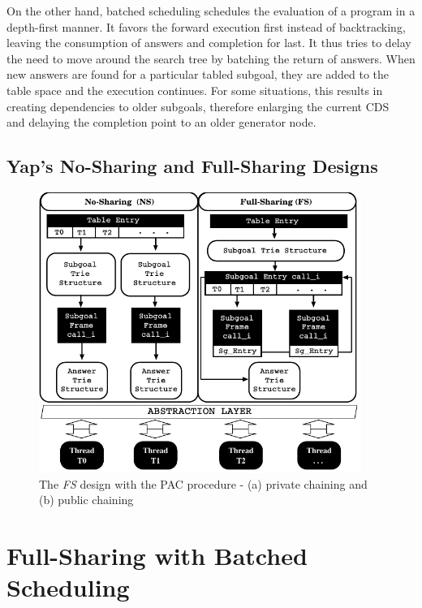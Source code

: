 \documentclass{llncs}
\begin{document}
On the other hand, batched scheduling schedules the evaluation of a
program in a depth-first manner. It favors the forward execution first
instead of backtracking, leaving the consumption of answers and
completion for last. It thus tries to delay the need to move around
the search tree by batching the return of answers. When new answers
are found for a particular tabled subgoal, they are added to the table
space and the execution continues. For some situations, this results
in creating dependencies to older subgoals, therefore enlarging the
current CDS~\cite{Sagonas-98} and delaying the completion point to an
older generator node.

\subsection{Yap's No-Sharing and Full-Sharing Designs}

\begin{figure}[!ht]
\centering
\includegraphics[width=10.5cm]{figures/arch.pdf}
\caption{The \emph{FS} design with the PAC procedure - (a) private
  chaining and (b) public chaining}
\label{fig_tabtries_pcc}
\end{figure}



\section{Full-Sharing with Batched Scheduling}

\end{document}
